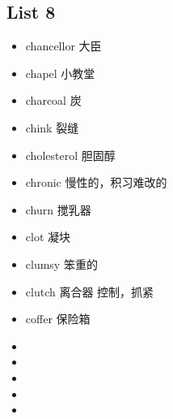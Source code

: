 \documentclass[a4paper,10pt]{article}
\begin{document}
\begin{CJK*}{UTF8}{gkai}
\section{List 8}
\begin{itemize}
\item chancellor 大臣 
\hspace{1cm}
\item chapel 小教堂
\hspace{1cm}
\item charcoal 炭
\hspace{1cm}
\item chink 裂缝
\hspace{1cm}
\item cholesterol 胆固醇
\hspace{1cm}
\item chronic 慢性的，积习难改的
\hspace{1cm}
\item churn 搅乳器
\hspace{1cm}
\item clot 凝块
\hspace{1cm}
\item clumsy 笨重的
\hspace{1cm}
\item clutch 离合器 控制，抓紧
\hspace{1cm}
\item coffer 保险箱
\hspace{1cm}
\item 
\hspace{1cm}
\item 
\hspace{1cm}
\item 
\hspace{1cm}
\item 
\hspace{1cm}
\item 
\hspace{1cm}
\end{itemize}

\newpage

\end{CJK*}
\end{document}
